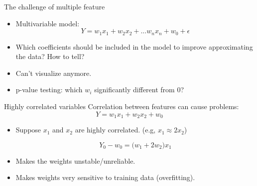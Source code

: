 \documentclass{beamer}
\begin{document}
\begin{frame}{The challenge of multiple feature}

		\begin{itemize} 
		\item Multivariable model: $$ Y = w_1x_1 + w_2x_2 + ... w_nx_n + w_0 + \epsilon $$
		\item Which coefficients should be included in the model to improve approximating the data? How to tell?
		\item Can't visualize anymore.
		\item p-value testing: which $w_i$ significantly different from 0?
	\end{itemize}

\end{frame}

\begin{frame}{Highly correlated variables}
	Correlation between features can cause problems: 
	$$ Y = w_1x_1 + w_2x_2 + w_0$$
	\begin{itemize}
	
		\item Suppose $x_1$ and $x_2$ are highly correlated. (e.g, $x_1 \approx 2 x_2$)
		
		$$ Y_0 - w_0 = \Big(w_1 + 2w_2\Big)x_1 $$
		\item Makes the weights unstable/unreliable.
		\item Makes weights very sensitive to training data (overfitting).
	\end{itemize}
\end{frame}
\end{document}
